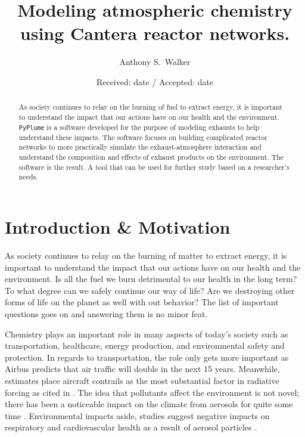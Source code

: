 \documentclass[smallextended,referee]{svjour3}
\begin{document}
\title{Modeling atmospheric chemistry using Cantera reactor networks.}


\author{Anthony S.~Walker}

\date{Received: date / Accepted: date}
\def\pyplume{\texttt{PyPlume}}
\def\SCALE{0.5}

\maketitle 

\begin{abstract}
As society continues to relay on the burning of fuel to extract energy, it is important to understand the impact that our actions have on our health and the environment. \pyplume{} is a software developed for the purpose of modeling exhausts to help understand these impacts. The software focuses on building complicated reactor networks to more practically simulate the exhaust-atmosphere interaction and understand the composition and effects of exhaust products on the environment. The software is the result. A tool that can be used for further study based on a researcher's needs. 
\end{abstract}

\section{Introduction \& Motivation}

As society continues to relay on the burning of matter to extract energy, it is important to understand the impact that our actions have on our health and the environment. Is all the fuel we burn detrimental to our health in the long term? To what degree can we safely continue our way of life? Are we destroying other forms of life on the planet as well with out behavior? The list of important questions goes on and answering them is no minor feat.

Chemistry plays an important role in many aspects of today's society such as transportation, healthcare, energy production, and environmental safety and protection. In regards to transportation, the role only gets more important as Airbus predicts that air traffic will double in the next 15 years\cite{Airbus2019Global2019-2038}. Meanwhile, estimates place aircraft contrails as the most substantial factor in radiative forcing \cite{Burkhardt2011GlobalCirrus,Stocker2013ClimateChange} as cited in \cite{Caiazzo2017ImpactWarming}. The idea that pollutants affect the environment is not novel; there has been a noticeable impact on the climate from aerosols for quite some time \cite{Mitchell1971TheSurface}. Environmental impacts aside, studies suggest negative impacts on respiratory and cardiovascular health as a result of aerosol particles \cite{2014HealthAerosols,Poschl2005AtmosphericEffects}.
\end{document}
